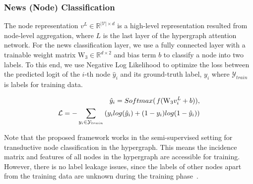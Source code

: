 \documentclass[conference]{IEEEtran}
\newcommand{\minus}{\scalebox{1.0}[1.0]{$-$}}
\begin{document}
\subsubsection{News (Node) Classification} The node representation $v^{\mathit{L}} \in  \mathbb{R}^{|\mathcal{V}| \times \mathit{d}}$ is a high-level representation resulted from node-level aggregation, where $\mathit{L}$ is the last layer of the hypergraph attention network. For the news classification layer, we use a fully connected layer with a trainable weight matrix $\mathrm{W_3}\in\mathbb{R}^{ \mathit{d} \times 2} $ and bias term $b$ to classify a node into two labels. To this end, we use Negative Log Likelihood to optimize the loss between the predicted logit of the $\textit{i}$-th node $\hat{y}_{i}$ and its ground-truth label, $y_{i}$ where $\mathcal{Y}_{train}$ is labels for training data.

\begin{equation}
\begin{aligned}
    \hat{y}_i  = Softmax(\:\mathit{f}(\mathrm{W_3} v^{\mathit{L}}_i + b) ),\\
    \mathcal{L} = \minus\sum_{y_i \in \mathcal{Y}_{train}}{\left( y_{i} log(\hat{y}_i) +  (1-y_i)log{(1-\hat{y}_i)} \right)}
\end{aligned}
\end{equation}


Note that the proposed framework works in the semi-supervised setting for transductive node classification in the hypergraph. This means the incidence matrix and features of all nodes in the hypergraph are accessible for training. However, there is no label leakage issues, since the labels of other nodes apart from the training data are unknown during the training phase~\cite{zhou2003learning}.
\end{document}
